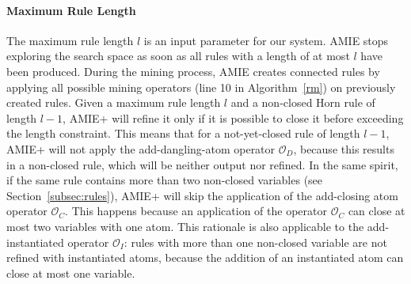 \paragraph{Maximum Rule Length}
% 
The maximum rule length $l$ is an input parameter for our system. AMIE stops exploring the search space as soon as all rules with 
a length of at most $l$ have been produced.
During the mining process, AMIE creates connected rules by applying all possible mining operators 
(line 10 in Algorithm~\ref{rm}) on previously created rules.
Given a maximum rule length $l$ and a non-closed Horn rule of length $l-1$, AMIE+
will refine it only if it is possible to close it before exceeding the length constraint.
This means that for a not-yet-closed rule of length $l-1$, AMIE+ will not apply 
the add-dangling-atom operator $\mathcal{O}_D$, because this results in a non-closed rule,
which will be neither output nor refined. In the same spirit, if the same rule contains more than
two non-closed variables (see Section~\ref{subsec:rules}), AMIE+ will skip the application of 
the add-closing atom operator $\mathcal{O}_C$. This happens because an application of the operator 
$\mathcal{O}_C$ can close at most two variables with one atom. 
This rationale is also applicable to the add-instantiated operator $\mathcal{O}_I$:
rules with more than one non-closed variable are not refined with instantiated atoms, 
because the addition of an instantiated atom can close at most one variable.

